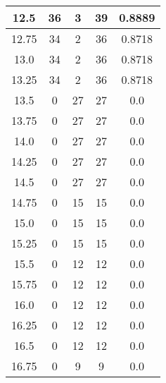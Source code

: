 \documentclass[letterpaper, 12pt]{article}
\begin{document}
\begin{longtable}{|c|c|c|c|c|}
\hline
12.5 & 36 & 3 & 39 & 0.8889 \\
\hline
12.75 & 34 & 2 & 36 & 0.8718 \\
\hline
13.0 & 34 & 2 & 36 & 0.8718 \\
\hline
13.25 & 34 & 2 & 36 & 0.8718 \\
\hline
13.5 & 0 & 27 & 27 & 0.0 \\
\hline
13.75 & 0 & 27 & 27 & 0.0 \\
\hline
14.0 & 0 & 27 & 27 & 0.0 \\
\hline
14.25 & 0 & 27 & 27 & 0.0 \\
\hline
14.5 & 0 & 27 & 27 & 0.0 \\
\hline
14.75 & 0 & 15 & 15 & 0.0 \\
\hline
15.0 & 0 & 15 & 15 & 0.0 \\
\hline
15.25 & 0 & 15 & 15 & 0.0 \\
\hline
15.5 & 0 & 12 & 12 & 0.0 \\
\hline
15.75 & 0 & 12 & 12 & 0.0 \\
\hline
16.0 & 0 & 12 & 12 & 0.0 \\
\hline
16.25 & 0 & 12 & 12 & 0.0 \\
\hline
16.5 & 0 & 12 & 12 & 0.0 \\
\hline
16.75 & 0 & 9 & 9 & 0.0 \\
\hline
\end{longtable}
\end{document}
